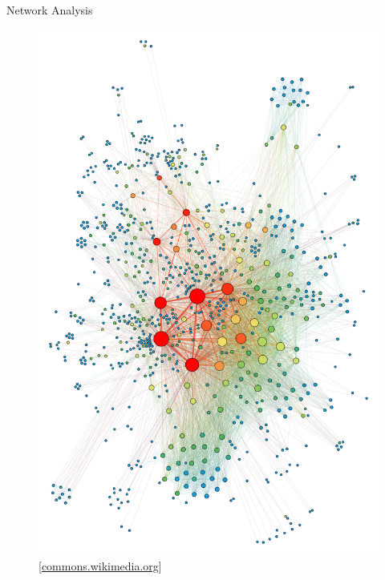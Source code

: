 \documentclass[10pt,titlepage,english,presentation]{beamer}
\begin{document}
\begin{frame}[t]{Network Analysis}
\begin{minipage}[t]{.45\textwidth}
{\begin{figure}[c]
\includegraphics[width=.7\textwidth]{./images/betweenness.png}
\caption*{\tiny[\url{commons.wikimedia.org}]}
\end{figure}}
\end{minipage}
\end{frame}
\end{document}
